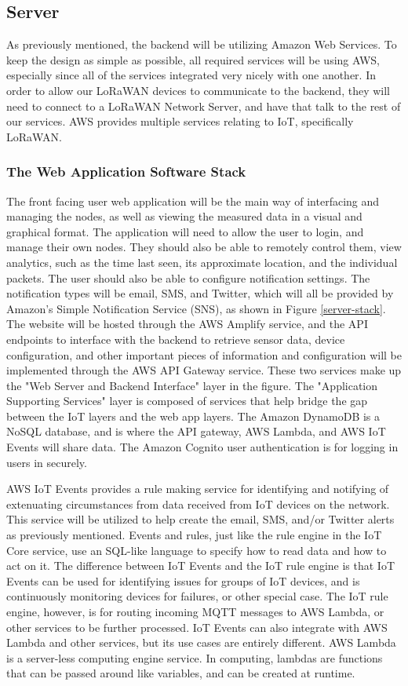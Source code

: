 \subsection{Server}
As previously mentioned, the backend will be utilizing Amazon Web Services. To keep the design as
simple as possible, all required services will be using AWS, especially since all of the services
integrated very nicely with one another. In order to allow our LoRaWAN devices to communicate to the
backend, they will need to connect to a LoRaWAN Network Server, and have that talk to the rest of
our services. AWS provides multiple services relating to IoT, specifically LoRaWAN.

\subsubsection{The Web Application Software Stack}
The front facing user web application will be the main way of interfacing and managing the nodes, as
well as viewing the measured data in a visual and graphical format. The application will need to
allow the user to login, and manage their own nodes. They should also be able to remotely control
them, view analytics, such as the time last seen, its approximate location, and the individual
packets. The user should also be able to configure notification settings. The notification types
will be email, SMS, and Twitter, which will all be provided by Amazon's Simple Notification Service
(SNS), as shown in Figure \ref{server-stack}. The website will be hosted through the AWS Amplify
service, and the API endpoints to interface with the backend to retrieve sensor data, device
configuration, and other important pieces of information and configuration will be implemented
through the AWS API Gateway service. These two services make up the "Web Server and Backend
Interface" layer in the figure. The "Application Supporting Services" layer is composed of services
that help bridge the gap between the IoT layers and the web app layers. The Amazon DynamoDB is
a NoSQL database, and is where the API gateway, AWS Lambda, and AWS IoT Events will share data. The
Amazon Cognito user authentication is for logging in users in securely. 

AWS IoT Events provides a rule making service for identifying and notifying of extenuating
circumstances from data received from IoT devices on the network. This service will be utilized to
help create the email, SMS, and/or Twitter alerts as previously mentioned. Events and rules, just
like the rule engine in the IoT Core service, use an SQL-like language to specify how to read data
and how to act on it. The difference between IoT Events and the IoT rule engine is that IoT Events
can be used for identifying issues for groups of IoT devices, and is continuously monitoring devices
for failures, or other special case. The IoT rule engine, however, is for routing incoming MQTT
messages to AWS Lambda, or other services to be further processed. IoT Events can also integrate
with AWS Lambda and other services, but its use cases are entirely different. AWS Lambda is
a server-less computing engine service. In computing, lambdas are functions that can be passed
around like variables, and can be created at runtime.


